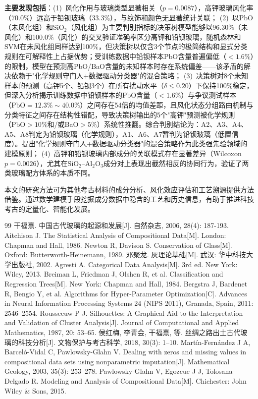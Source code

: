 \documentclass[12pt,a4paper]{ctexart}
\begin{document}
\textbf{主要发现包括}：(1)~风化作用与玻璃类型显著相关（$p=0.0087$），高钾玻璃风化率（70.0\%）远高于铅钡玻璃（33.3\%），与纹饰和颜色无显著统计关联；
(2)~以PbO（未风化组）和SiO$_2$（风化组）为主要判别指标的决策树模型能够以96.30\%（未风化）和100.0\%（风化）的交叉验证准确率区分高钾和铅钡玻璃，随机森林和SVM在未风化组同样达到100\%，但决策树以仅含3个节点的极简结构和显式分类规则在可解释性上占据优势；受训练数据中铅钡样本PbO含量普遍偏低（$<1.6\%$）的限制，模型在预测高PbO/BaO含量的未知样本时存在系统偏差——该矛盾的解决依赖于"化学规则守门人+数据驱动分类器"的混合策略；
(3)~决策树对8个未知样本的预测（高钾5个、铅钡3个）在所有扰动水平（$\delta\le0.20$）下保持100\%稳定，但深入分析揭示训练数据中铅钡样本的PbO含量（$<1.6\%$）与争议测试样本（PbO$=12.3\%\sim40.0\%$）之间存在54倍的均值差距，且风化状态分组路由机制与分类特征之间存在结构性错配，导致决策树输出的5个"高钾"预测被化学规则（PbO$>10\%$和/或BaO$>5\%$）系统性推翻。综合判别结论为：A2、A3、A4、A5、A8判定为铅钡玻璃（化学规则），A1、A6、A7暂判为铅钡玻璃（低置信度）。提出"化学规则守门人+数据驱动分类器"的混合策略作为此类强先验领域的建模原则；
(4)~高钾和铅钡玻璃内部成分的关联模式存在显著差异（Wilcoxon $p=0.0026$），尤其在SiO$_2$--Al$_2$O$_3$成分对上表现出截然相反的协同行为，验证了两类玻璃配方体系的本质不同。

本文的研究方法可为其他考古材料的成分分析、风化效应评估和工艺溯源提供方法借鉴。通过数学建模手段挖掘成分数据中隐含的工艺和历史信息，有助于推进科技考古的定量化、智能化发展。

\newpage

\begin{thebibliography}{99}
 干福熹. 中国古代玻璃的起源和发展[J]. 自然杂志, 2006, 28(4): 187-193.
 Aitchison J. The Statistical Analysis of Compositional Data[M]. London: Chapman and Hall, 1986.
 Newton R, Davison S. Conservation of Glass[M]. Oxford: Butterworth-Heinemann, 1989.
 邓聚龙. 灰理论基础[M]. 武汉: 华中科技大学出版社, 2002.
 Agresti A. Categorical Data Analysis[M]. 3rd ed. New York: Wiley, 2013.
 Breiman L, Friedman J, Olshen R, et al. Classification and Regression Trees[M]. New York: Chapman and Hall, 1984.
 Bergstra J, Bardenet R, Bengio Y, et al. Algorithms for Hyper-Parameter Optimization[C]. Advances in Neural Information Processing Systems 24 (NIPS 2011), Granada, Spain, 2011: 2546--2554.
 Rousseeuw P J. Silhouettes: A Graphical Aid to the Interpretation and Validation of Cluster Analysis[J]. Journal of Computational and Applied Mathematics, 1987, 20: 53--65.
 侯红梅, 李青会, 干福熹, 等. 丝绸之路出土古代玻璃的科技分析[J]. 文物保护与考古科学, 2018, 30(3): 1--10.
 Mart\'{i}n-Fern\'{a}ndez J A, Barcel\'{o}-Vidal C, Pawlowsky-Glahn V. Dealing with zeros and missing values in compositional data sets using nonparametric imputation[J]. Mathematical Geology, 2003, 35(3): 253--278.
 Pawlowsky-Glahn V, Egozcue J J, Tolosana-Delgado R. Modeling and Analysis of Compositional Data[M]. Chichester: John Wiley \& Sons, 2015.
\end{thebibliography}
\end{document}
